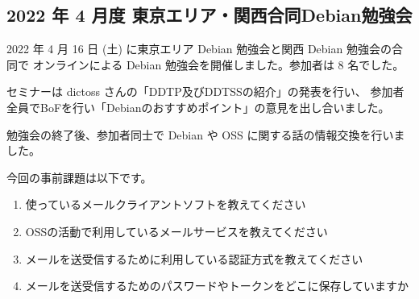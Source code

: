 \documentclass[mingoth,a4paper]{jsarticle}
\begin{document}

\subsection{2022 年 4 月度 東京エリア・関西合同Debian勉強会}

2022 年 4 月 16 日 (土) に東京エリア Debian 勉強会と関西 Debian 勉強会の合同で
オンラインによる Debian 勉強会を開催しました。参加者は 8 名でした。

セミナーは dictoss さんの「DDTP及びDDTSSの紹介」の発表を行い、
参加者全員でBoFを行い「Debianのおすすめポイント」の意見を出し合いました。

勉強会の終了後、参加者同士で Debian や OSS に関する話の情報交換を行いました。



今回の事前課題は以下です。

\begin{enumerate}
\item 使っているメールクライアントソフトを教えてください
\item OSSの活動で利用しているメールサービスを教えてください
\item メールを送受信するために利用している認証方式を教えてください
\item メールを送受信するためのパスワードやトークンをどこに保存していますか
\end{enumerate}


\begin{multicols}{2}
{\small

}
\end{multicols}

%
%
%
%



\end{document}
